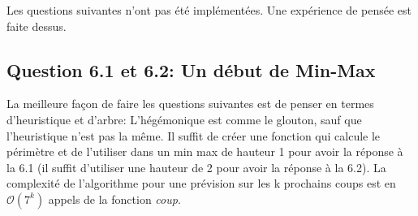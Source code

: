 \documentclass[11pt]{article}
\begin{document}
    Les questions suivantes n'ont pas été implémentées. Une expérience de pensée est faite dessus.

    \subsection*{Question 6.1 et 6.2: Un début de Min-Max}

    La meilleure façon de faire les questions suivantes est de penser en termes d'heuristique et d'arbre: L'hégémonique est comme le glouton, sauf que l'heuristique n'est pas la même. Il suffit de créer une fonction qui calcule le périmètre et de l'utiliser dans un min max de hauteur 1 pour avoir la réponse à la 6.1 (il suffit d'utiliser une hauteur de 2 pour avoir la réponse à la 6.2). La complexité de l'algorithme pour une prévision sur les k prochains coups est en $\mathcal{O}(7^k)$ appels de la fonction \textit{coup}. %
\end{document}
